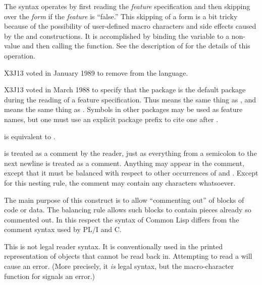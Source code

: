 \begin{flushdesc}
\begin{obsolete}
The \cd{\#+} syntax operates by first reading the {\it feature} specification
and then skipping over the {\it form} if the {\it feature} is ``false.''
This skipping of a form is a bit tricky because of the possibility of
user-defined macro characters and side effects caused by the  and 
\cd{\#,} constructions.  It is accomplished by binding the variable
 to a non-{\nil} value and then calling the 
function.  See the description of  for the details
of this operation.
\end{obsolete}
\begin{new}
X3J13 voted in January 1989
to remove \cd{\#,} from the language.
\end{new}
\begin{newer}
X3J13 voted in March 1988 
to specify that the  package is the default package during
the reading of a feature specification.  Thus  means the
same thing as , and
 means the same thing as .
Symbols in other packages
may be used as feature names, but one must use an explicit package prefix
to cite one after \cd{\#+}.
\end{newer}

\item[\cd{\#-}]
 is equivalent to .

\item[\cd{\#|}]
 is treated as a comment by the reader, just as everything
from a semicolon to the next newline is treated as a comment.
Anything may appear in the comment, except that it must be balanced
with respect to other occurrences of \cd{\#|} and \cd{|\#}.
Except for this nesting rule, the comment may contain any characters
whatsoever.

The main purpose of this construct is to allow ``commenting out''
of blocks of code or data.  The balancing rule allows such blocks
to contain pieces already so commented out.  In this respect
the  syntax of Common Lisp differs from the  comment syntax
used by {PL/I} and C.

\item[\cd{\#<}]
This is not legal reader syntax.
It is conventionally used in the printed representation of objects that cannot
be read back in.  Attempting to read a \cd{\#<} will cause an error.
(More precisely, it {\it is} legal syntax, but the macro-character
function for \cd{\#<} signals an error.)


\end{flushdesc}
